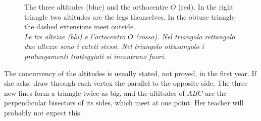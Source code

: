 \documentclass[10pt,a4paper,oneside]{book}
\newcommand{\bicap}[2]{\caption{#1\\{\color{itgreen}\itshape #2}}}
\begin{document}
\begin{figure}[htbp]
\bicap{The three altitudes (blue) and the orthocentre $O$ (red). In the right triangle two altitudes are the legs themselves. In the obtuse triangle the dashed extensions meet outside.}%
      {Le tre altezze (blu) e l'ortocentro $O$ (rosso). Nel triangolo rettangolo due altezze sono i cateti stessi. Nel triangolo ottusangolo i prolungamenti tratteggiati si incontrano fuori.}
\label{fig:ortho}
\end{figure}

\begin{tutor}
The concurrency of the altitudes is usually stated, not proved, in the first year. If she asks: draw through each vertex the parallel to the opposite side. The three new lines form a triangle twice as big, and the altitudes of $ABC$ are the perpendicular bisectors of its sides, which meet at one point. Her teacher will probably not expect this.
\end{tutor}
\end{document}
